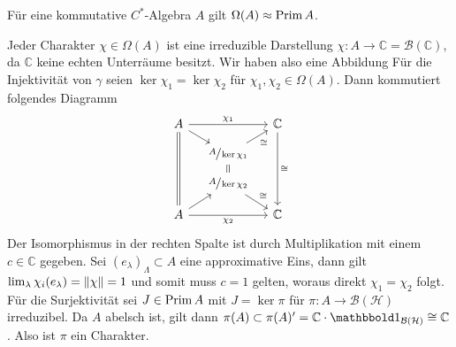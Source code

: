 \begin{satz}[label=satz:719,{name=[Für $A$ kommutativ ist das Charakterspektrum homöomorph zu den primitiven Idealen]}]
	Für eine kommutative $C^*$-Algebra $A$ gilt $\Omega(A) \approx \Prim A$.
\end{satz}
\begin{beweis}
	Jeder Charakter $\chi \in \Omega(A)$ ist eine irreduzible Darstellung $\chi \colon A \to \mathbb{C} = \mathcal{B}(\mathbb{C})$, da $\mathbb{C}$ keine echten Unterräume besitzt.
	Wir haben also eine Abbildung 
	Für die Injektivität von $\gamma$ seien $\ker \chi_1= \ker \chi_2$ für $\chi_1, \chi_2 \in \Omega(A)$. 
	Dann kommutiert folgendes Diagramm 
	\[
		\begin{tikzcd}[sep=small]
			A \ar[rr,"\chi_1"] \ar[ddd,equal] \drar& & \mathbb{C} \ar[ddd,"\cong"]\\
			& \sfrac{A}{\ker \chi_1} \urar["\cong"'] \dar[equal] \\[-2.3pt]
			& \sfrac{A}{\ker \chi_2} \drar["\cong"] \\
			A \ar[rr,"\chi_2"'] \urar& & \mathbb{C}
		\end{tikzcd}
	\]
	Der Isomorphismus in der rechten Spalte ist durch Multiplikation mit einem $c \in \mathbb{C}$ gegeben.
	Sei $(e_\lambda)_\Lambda \subset A$ eine approximative Eins, dann gilt $\lim_\lambda \chi_i(e_\lambda) = \norm*{\chi} =1$ und somit muss $c=1$ gelten, woraus direkt $\chi_1=\chi_2$ folgt.	
	Für die Surjektivität sei $J \in \Prim A$ mit $J= \ker \pi$ für $\pi \colon A \to \mathcal{B}(\mathcal{H})$ irreduzibel.
	Da $A$ abelsch ist, gilt dann $\pi(A) \subset \pi(A)' = \mathbb{C} \cdot \ind_{\mathcal{B}(\mathcal{H})} \cong \mathbb{C}$.
	Also ist $\pi$ ein Charakter.
	

\end{beweis}
